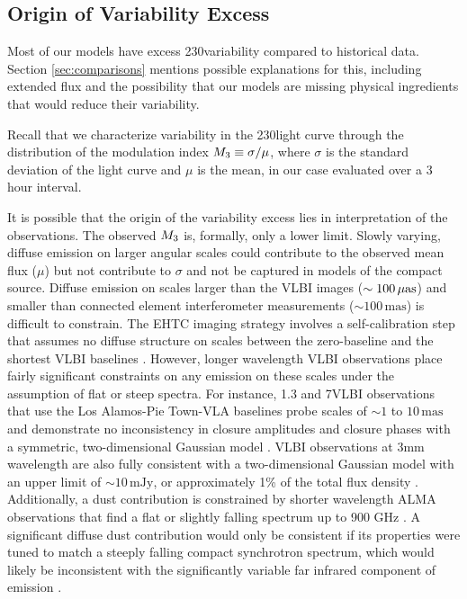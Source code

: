 

\subsection{Origin of Variability Excess}

Most of our models have excess 230\GHz variability compared to historical data.
Section \ref{sec:comparisons} mentions possible explanations for this, including extended flux and the possibility that our models are missing physical ingredients that would reduce their variability.

Recall that we characterize variability in the 230\GHz light curve through the distribution of the modulation index $M_{3} \equiv \sigma/\mu$, where $\sigma$ is the standard deviation of the light curve and $\mu$ is the mean, in our case evaluated over a 3 hour interval.

It is possible that the origin of the variability excess lies in interpretation of the observations.
The observed $M_{3}$ is, formally, only a lower limit.  Slowly varying, diffuse emission on larger angular scales could contribute to the observed mean flux ($\mu$) but not contribute to $\sigma$ and not be captured in models of the compact source.  Diffuse emission on scales larger than the VLBI images ($\sim 100\,\mathrm{\mu as}$) and smaller than connected element interferometer measurements ($\sim 100\,\mathrm{mas}$) is difficult to constrain.  The EHTC imaging strategy involves a self-calibration step that assumes no diffuse structure on scales between the zero-baseline and the shortest VLBI baselines .  However, longer wavelength VLBI observations place fairly significant constraints on any emission on these scales under the assumption of flat or steep spectra.  For instance, 1.3 and 7\mm VLBI observations that use the Los Alamos-Pie Town-VLA baselines probe scales of $\sim 1$ to $10\,\mathrm{mas}$ and demonstrate no inconsistency in closure amplitudes and closure phases with a symmetric, two-dimensional Gaussian model \citep{2004Sci...304..704B}.  VLBI observations at 3mm wavelength are also fully consistent with a two-dimensional Gaussian model with an upper limit of $\sim 10\,\mathrm{mJy}$, or approximately 1\% of the total flux density \citep{2019A&A...621A.119B}.  Additionally, a dust contribution is constrained by shorter wavelength ALMA observations that find a flat or slightly falling spectrum up to 900 GHz \citep{2019ApJ...881L...2B}.  A significant diffuse dust contribution would only be consistent if its properties were tuned to match a steeply falling compact synchrotron spectrum, which would likely be inconsistent with the significantly variable far infrared component of \sgra emission \citep{2016ApJ...825...32S, 2018ApJ...862..129V}.

